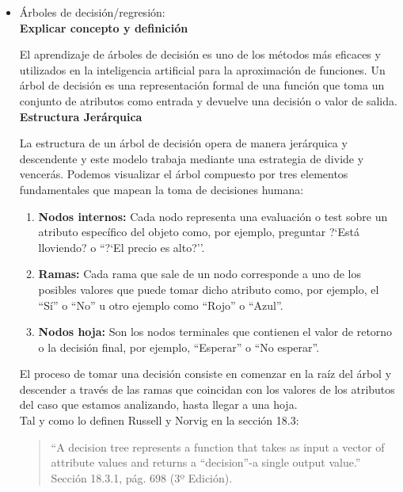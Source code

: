 \documentclass[letterpaper,12pt]{article}
\begin{document}
\begin{itemize}
    \item Árboles de decisión/regresión:\\
    
    \textbf{Explicar concepto y definición}
    
    El aprendizaje de árboles de decisión es uno de los métodos más eficaces y utilizados en la inteligencia artificial para la aproximación de funciones. Un árbol de decisión es una representación formal de una función que toma un conjunto de atributos como entrada y devuelve una decisión o valor de salida.\\
    
    \textbf{Estructura Jerárquica}
    
    La estructura de un árbol de decisión opera de manera jerárquica y descendente y este modelo trabaja mediante una estrategia de divide y vencerás. Podemos visualizar el árbol compuesto por tres elementos fundamentales que mapean la toma de decisiones humana:
    
    \begin{enumerate}
        \item \textbf{Nodos internos:} Cada nodo representa una evaluación o test sobre un atributo específico del objeto como, por ejemplo, preguntar ?`Está lloviendo? o ``?`El precio es alto?''.
        \item \textbf{Ramas:} Cada rama que sale de un nodo corresponde a uno de los posibles valores que puede tomar dicho atributo como, por ejemplo, el ``Sí'' o ``No'' u otro ejemplo como ``Rojo'' o ``Azul''.
        \item \textbf{Nodos hoja:} Son los nodos terminales que contienen el valor de retorno o la decisión final, por ejemplo, ``Esperar'' o ``No esperar''.\\
    \end{enumerate}
    
    El proceso de tomar una decisión consiste en comenzar en la raíz del árbol y descender a través de las ramas que coincidan con los valores de los atributos del caso que estamos analizando, hasta llegar a una hoja.\\
    
    Tal y como lo definen Russell y Norvig en la sección 18.3:
    
    \begin{quote}
    ``A decision tree represents a function that takes as input a vector of attribute values and returns a ``decision''-a single output value.'' Sección 18.3.1, pág. 698 (3º Edición).\\
    \end{quote}
    

\end{itemize}
\end{document}
